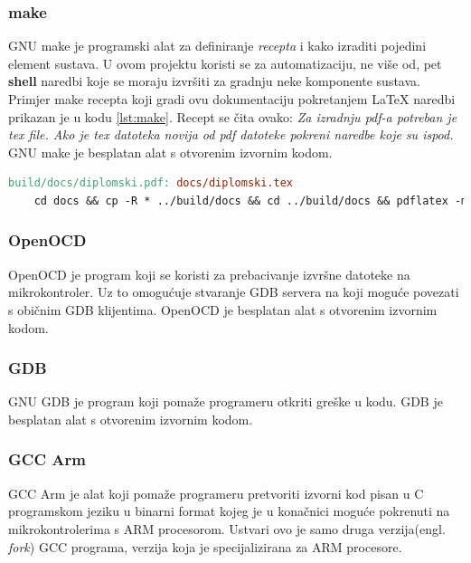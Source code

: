 \documentclass[times, utf8, diplomski]{diplomski}
\begin{document}
\subsubsection{make}
GNU make je programski alat za definiranje \textit{recepta} i kako izraditi pojedini element sustava. U ovom projektu koristi se za automatizaciju, ne više od, pet \textbf{shell} naredbi koje se moraju izvršiti za gradnju neke komponente sustava. Primjer make recepta koji gradi ovu dokumentaciju pokretanjem \LaTeX \cite{ungar2002uvod} naredbi prikazan je u kodu \ref{lst:make}. Recept se čita ovako: \textit{Za izradnju pdf-a potreban je tex file. Ako je tex datoteka novija od pdf datoteke pokreni naredbe koje su ispod.} GNU make je besplatan alat s otvorenim izvornim kodom.

\begin{lstlisting}[language=make, label={lst:make}, caption={Gradnja dokumentacije korištenjem make recepta}]
build/docs/diplomski.pdf: docs/diplomski.tex
	cd docs && cp -R * ../build/docs && cd ../build/docs && pdflatex -mltex diplomski.tex && bibtex diplomski && pdflatex -mltex diplomski.tex
\end{lstlisting}

\subsubsection{OpenOCD}
OpenOCD \cite{openocd} je program koji se koristi za prebacivanje izvršne datoteke na mikrokontroler. Uz to omogućuje stvaranje GDB servera na koji moguće povezati s običnim GDB klijentima. OpenOCD je besplatan alat s otvorenim izvornim kodom.

\subsubsection{GDB}
GNU GDB \cite{gdb} je program koji pomaže programeru otkriti greške u kodu. GDB je besplatan alat s otvorenim izvornim kodom.

\subsubsection{GCC Arm}
GCC Arm \cite{armgcc} je alat koji pomaže programeru pretvoriti izvorni kod pisan u C programskom jeziku u binarni format kojeg je u konačnici moguće pokrenuti na mikrokontrolerima s ARM procesorom. Ustvari ovo je samo druga verzija(engl. \textit{fork}) GCC \cite{gcc} programa, verzija koja je specijalizirana za ARM procesore.
\end{document}

